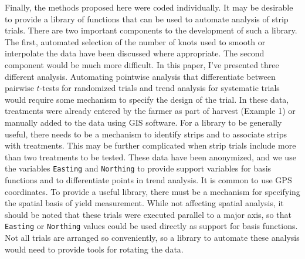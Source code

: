 \documentclass[phdcss]{SDSUThesis}
\begin{document}
Finally, the methods proposed here were coded individually. It may be desirable to provide a library of functions that can be used to automate analysis of strip trials. There are two important components to the development of such a library. The first, automated selection of the number of knots used to smooth or interpolate the data have been discussed where appropriate. The second component would be much more difficult. In this paper, I've presented three different analysis. Automating pointwise analysis that differentiate between pairwise $t$-tests for randomized trials and trend analysis for systematic trials would require some mechanism to specify the design of the trial. In these data, treatments were already entered by the farmer as part of harvest (Example 1) or manually added to the data using GIS software. For a library to be generally useful, there needs to be a mechanism to identify strips and to associate strips with treatments. This may be further complicated when strip trials include more than two treatments to be tested. These data have been anonymized, and we use the variables \texttt{Easting} and \texttt{Northing} to provide support variables for basis functions and to differentiate points in trend analysis. It is common to use GPS coordinates. To provide a useful library, there must be a mechanism for specifying the spatial basis of yield measurement. While not affecting spatial analysis, it should be noted that these trials were executed parallel to a major axis, so that \texttt{Easting} or \texttt{Northing} values could be used directly as support for basis functions. Not all trials are arranged so conveniently, so a library to automate these analysis would need to provide tools for rotating the data.


\renewcommand\bibname{References}
\clearpage

\addcontentsline{toc}{part}{\bibname}



\appendix
\clearpage 
{}
{}
\end{document}

